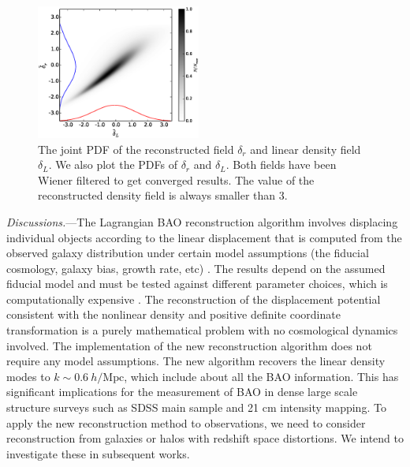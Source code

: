 \documentclass[aps,prl,twocolumn,showpacs,superscriptaddress,groupedaddress,nofootinbib]{revtex4}  %
\newcommand{\mr}{\mathrm}
\begin{document}
\begin{figure}[tbp]
\begin{center}
\includegraphics[width=0.48\textwidth]{jointpdf1.eps}
\end{center}
\vspace{-0.7cm}
\caption{The joint PDF of the reconstructed field 
    $\delta_r$ and linear density field $\delta_L$. We also plot the 
PDFs of $\delta_r$ and $\delta_L$. Both fields
have been Wiener filtered to get converged results. The value of the 
reconstructed density field is always smaller than 3.}
\label{fig:pdf}
\end{figure}



{\it Discussions.}---The Lagrangian BAO reconstruction algorithm involves displacing 
individual objects according to the linear displacement that is computed from the observed
galaxy distribution under certain model assumptions (the fiducial cosmology, galaxy bias, 
growth rate, etc) \cite{2007bao,2015marcel}.
The results depend on the assumed fiducial model and must be tested against different 
parameter choices, which is computationally expensive \cite{2012nikhil}.
The reconstruction of the displacement potential consistent with the nonlinear density
and positive definite coordinate transformation is a purely mathematical problem with no
cosmological dynamics involved. 
The implementation of the new reconstruction algorithm does not require any model assumptions.
The new algorithm recovers the linear density modes to $k\sim0.6\ h/\mr{Mpc}$, 
which include about all the BAO information. 
This has significant implications for the measurement of BAO in dense large scale structure
surveys such as SDSS main sample and 21 cm intensity mapping.
To apply the new reconstruction method to observations, we need to consider 
reconstruction from galaxies or halos with redshift space distortions.
We intend to investigate these in subsequent works. 
\end{document}
